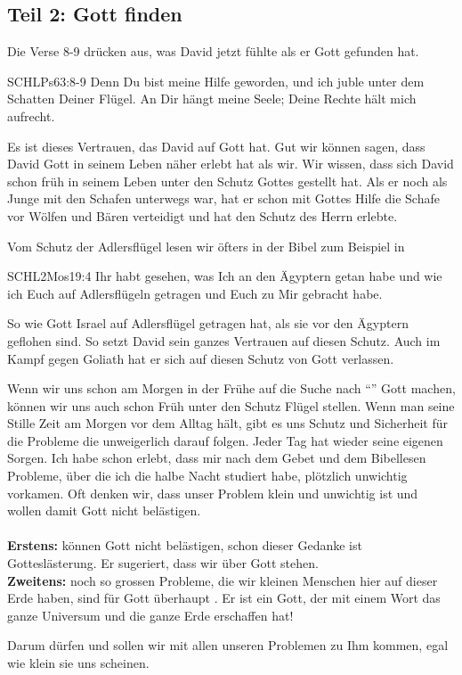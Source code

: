 \documentclass[14pt]{mybib}
\begin{document}
    \subsection*{Teil 2: Gott finden}
    \begin{otsblock}
        Die Verse 8-9 drücken aus, was David jetzt fühlte als er Gott gefunden hat.
        \begin{bibelbox}{SCHL}{Ps}{63:8-9}
            Denn Du bist meine Hilfe geworden, und ich juble unter dem Schatten Deiner Flügel. An Dir hängt meine Seele; Deine Rechte hält mich aufrecht.
        \end{bibelbox}
        Es ist dieses Vertrauen, das David auf Gott hat. Gut wir können sagen, dass David Gott in seinem Leben näher erlebt hat als wir. Wir wissen, dass sich David schon früh in seinem Leben unter den Schutz Gottes gestellt hat. Als er noch als Junge mit den Schafen unterwegs war, hat er schon mit Gottes Hilfe die Schafe vor Wölfen und Bären verteidigt und hat den Schutz des Herrn erlebte.

        Vom Schutz der Adlersflügel lesen wir öfters in der Bibel zum Beispiel in
        \begin{bibelbox}{SCHL}{2Mos}{19:4}
            Ihr habt gesehen, was Ich an den Ägyptern getan habe und wie ich Euch auf Adlersflügeln getragen und Euch zu Mir gebracht habe.
        \end{bibelbox}
         So wie Gott Israel auf Adlersflügel getragen hat, als sie vor den Ägyptern geflohen sind. So setzt David sein ganzes Vertrauen auf diesen Schutz. Auch im Kampf gegen Goliath hat er sich auf diesen Schutz von Gott verlassen. 
    \end{otsblock}
    \begin{otsblock}
        Wenn wir uns schon am Morgen in der Frühe auf die Suche nach \enquote{} Gott machen, können wir uns auch schon Früh unter den Schutz  Flügel stellen. Wenn man seine Stille Zeit am Morgen vor dem Alltag hält, gibt es uns Schutz und Sicherheit für die Probleme die unweigerlich darauf folgen. Jeder Tag hat wieder seine eigenen Sorgen. 
        Ich habe schon erlebt, dass mir nach dem Gebet und dem Bibellesen Probleme, über die ich die halbe Nacht studiert habe, plötzlich unwichtig vorkamen. Oft denken wir, dass unser Problem klein und unwichtig ist und wollen damit Gott nicht belästigen.\\        
         \\        
        \textbf{Erstens:}  können Gott nicht belästigen, schon dieser Gedanke ist Gotteslästerung. Er sugeriert, dass wir über Gott stehen. \\        
        \textbf{Zweitens:}  noch so grossen Probleme, die wir kleinen Menschen hier auf dieser Erde haben, sind für Gott überhaupt . Er ist ein Gott, der mit einem Wort das ganze Universum und die ganze Erde erschaffen hat!

        Darum dürfen und sollen wir mit allen unseren Problemen zu Ihm kommen, egal wie klein sie uns scheinen.
    \end{otsblock}
\end{document}
